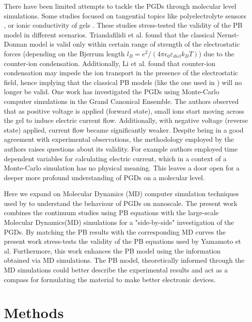 \documentclass[twoside,twocolumn,9pt]{article}
\begin{document}
There have been limited attempts to tackle the PGDs through molecular level simulations. Some studies focused on tangential topics like polyelectrolyte sensors \cite{Triandafilidi2018MolecularEffect}, or ionic conductivity of gels \cite{Li2016}. These studies stress-tested the validity of the PB model in different scenarios. Triandafilidi et al. \cite{Triandafilidi2018MolecularEffect} found that the classical Nernst-Donnan model is valid only within certain range of strength of the electrostatic forces (depending on the Bjerrum length $l_B = e^2/(4 \pi \epsilon_0\varepsilon_{diel}k_B T)$) due to the counter-ion condensation. Additionally, Li et al. \cite{Li2016} found that counter-ion condensation may impede the ion transport in the presence of the electrostatic field, hence implying that the classical PB models (like the one used in \cite{Yamamoto2014ElectrochemicalDiodes}) will no longer be valid. One work \cite{Lee2012Grand-canonicalDiode} has investigated the PGDs using Monte-Carlo computer simulations in the Grand Canonical Ensemble. The authors observed that as positive voltage is applied (forward state), small ions start moving across the gel to induce electric current flow. Additionally, with negative voltage (reverse state) applied, current flow became significantly weaker. Despite being in a good agreement with experimental observations, the methodology employed by the authors raises questions about its validity. For example authors employed time dependent variables  for calculating electric current, which in a context of a Monte-Carlo simulation has no physical meaning. This leaves a door open for a deeper more profound understanding of PGDs on a molecular level.


Here we expand on Molecular Dynamics (MD) computer simulation techniques used by \cite{Li2016,Triandafilidi2018MolecularEffect} to understand the behaviour of PGDs on nanoscale.  The present work combines the continuum studies using PB equations with the large-scale Molecular Dynamics(MD) simulations for a "side-by-side" investigation of the PGDs. By matching the PB results with the corresponding MD curves the present work stress-tests the validity of the PB equations used by Yamamoto et al. Furthermore, this work enhances the PB model using the information obtained via MD simulations. The PB model, theoretically informed through the MD simulations could better describe the experimental results and act as a compass for formulating the material to make better electronic devices.


\section{Methods}
\end{document}
